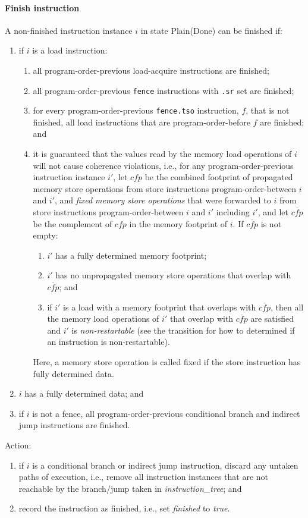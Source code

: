 \paragraph{Finish instruction}\label{omm:finish}
A non-finished instruction instance $i$ in state {\sc Plain}({\sc Done}) can be finished if:
\begin{enumerate}
\item if $i$ is a load instruction:
  \begin{enumerate}
  \item all program-order-previous load-acquire instructions are finished;
  \item all program-order-previous {\tt fence} instructions with {\tt .sr} set are finished;
  \item for every program-order-previous {\tt fence.tso} instruction, $f$, that is not finished, all load instructions that are program-order-before $f$ are finished; and
  \item it is guaranteed that the values read by the memory load operations of $i$ will not cause coherence violations, i.e., for any program-order-previous instruction instance $i'$, let $\textit{cfp}$ be the combined footprint of propagated memory store operations from store instructions program-order-between $i$ and $i'$, and {\em fixed memory store operations} that were forwarded to $i$ from store instructions program-order-between $i$ and $i'$ including $i'$, and let $\overline{\textit{cfp}}$ be the complement of $\textit{cfp}$ in the memory footprint of $i$.
  If $\overline{\textit{cfp}}$ is not empty:
    \begin{enumerate}
    \item $i'$ has a fully determined memory footprint;
    \item $i'$ has no unpropagated memory store operations that overlap with $\overline{\textit{cfp}}$; and
    \item if $i'$ is a load with a memory footprint that overlaps with $\overline{\textit{cfp}}$, then all the memory load operations of $i'$ that overlap with $\overline{\textit{cfp}}$ are satisfied and $i'$ is {\em non-restartable} (see the  transition for how to determined if an instruction is non-restartable).
    \end{enumerate}
  Here, a memory store operation is called fixed if the store instruction has fully determined data.
  \end{enumerate}
\item $i$ has a fully determined data; and
\item if $i$ is not a fence, all program-order-previous conditional branch and indirect jump instructions are finished.
\end{enumerate}
Action:
\begin{enumerate}
\item if $i$ is a conditional branch or indirect jump instruction, discard any untaken paths of execution, i.e., remove all instruction instances that are not reachable by the branch/jump taken in {\it instruction\_tree}; and
\item record the instruction as finished, i.e., set {\it finished} to {\it true}.
\end{enumerate}


